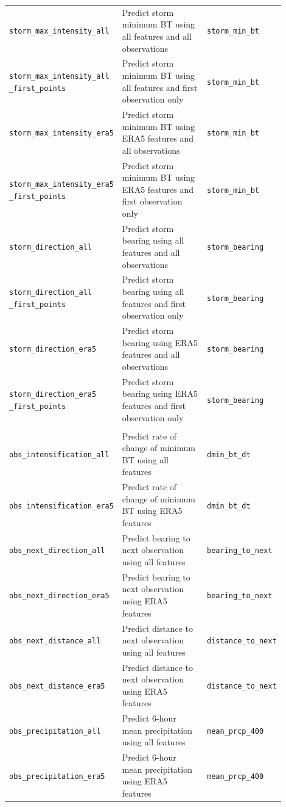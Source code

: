 {\begin{longtable}{>{\raggedright\arraybackslash}p{0.27\linewidth} p{0.43\linewidth} >{\raggedright\arraybackslash}p{0.20\linewidth}}
    \multicolumn{3}{c}{\textit{Storm Aggregate Prediction Tasks}} \\
    \midrule
    \texttt{storm\_max\_intensity\_all} & Predict storm minimum BT using all features and all observations & \texttt{storm\_min\_bt} \\
    \texttt{storm\_max\_intensity\_all \_first\_points} & Predict storm minimum BT using all features and first observation only & \texttt{storm\_min\_bt} \\
    \texttt{storm\_max\_intensity\_era5} & Predict storm minimum BT using ERA5 features and all observations & \texttt{storm\_min\_bt} \\
    \texttt{storm\_max\_intensity\_era5 \_first\_points} & Predict storm minimum BT using ERA5 features and first observation only & \texttt{storm\_min\_bt} \\
    \texttt{storm\_direction\_all} & Predict storm bearing using all features and all observations & \texttt{storm\_bearing} \\
    \texttt{storm\_direction\_all \_first\_points} & Predict storm bearing using all features and first observation only & \texttt{storm\_bearing} \\
    \texttt{storm\_direction\_era5} & Predict storm bearing using ERA5 features and all observations & \texttt{storm\_bearing} \\
    \texttt{storm\_direction\_era5 \_first\_points} & Predict storm bearing using ERA5 features and first observation only & \texttt{storm\_bearing} \\
    \midrule
    \multicolumn{3}{c}{\textit{Immediate Characteristic Prediction Tasks}} \\
    \midrule
    \texttt{obs\_intensification\_all} & Predict rate of change of minimum BT using all features & \texttt{dmin\_bt\_dt} \\
    \texttt{obs\_intensification\_era5} & Predict rate of change of minimum BT using ERA5 features & \texttt{dmin\_bt\_dt} \\
    \texttt{obs\_next\_direction\_all} & Predict bearing to next observation using all features & \texttt{bearing\_to\_next} \\
    \texttt{obs\_next\_direction\_era5} & Predict bearing to next observation using ERA5 features & \texttt{bearing\_to\_next} \\
    \texttt{obs\_next\_distance\_all} & Predict distance to next observation using all features & \texttt{distance\_to\_next} \\
    \texttt{obs\_next\_distance\_era5} & Predict distance to next observation using ERA5 features & \texttt{distance\_to\_next} \\
    \texttt{obs\_precipitation\_all} & Predict 6-hour mean precipitation using all features & \texttt{mean\_prcp\_400} \\
    \texttt{obs\_precipitation\_era5} & Predict 6-hour mean precipitation using ERA5 features & \texttt{mean\_prcp\_400} \\
\end{longtable}
}